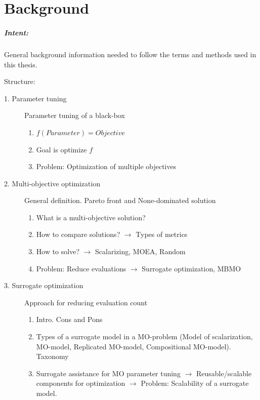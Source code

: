 \chapter{Background}\label{sec:background}

    \begin{blockquote}
        \paragraph{Intent:} General background information needed to follow the terms and methods used in this thesis. 
                
        Structure:
        \begin{description}
            \item[1. Parameter tuning] Parameter tuning of a black-box
                \begin{enumerate}
                    \item $f(Parameter) = Objective$ 
                    \item Goal is optimize $f$
                    \item Problem: Optimization of multiple objectives
                \end{enumerate}
            \item[2. Multi-objective optimization] General definition. Pareto front and None-dominated solution
                \begin{enumerate}
                    \item What is a multi-objective solution?
                    \item How to compare solutions? $\rightarrow$ Types of metrics
                    \item How to solve? $\rightarrow$ Scalarizing, MOEA, Random
                    \item Problem: Reduce evaluations $\rightarrow$ Surrogate optimization, MBMO
                \end{enumerate}
            \item[3. Surrogate optimization] Approach for reducing evaluation count
                \begin{enumerate}
                    \item Intro. Cons and Pons
                    \item Types of a surrogate model in a MO-problem (Model of scalarization, MO-model, Replicated MO-model, Compositional MO-model). Taxonomy
                    \item Surrogate assistance for MO parameter tuning $\rightarrow$ Reusable/scalable components for optimization $\rightarrow$ Problem: Scalability of a surrogate model.                  

\end{enumerate}
\end{description}
\end{blockquote}
